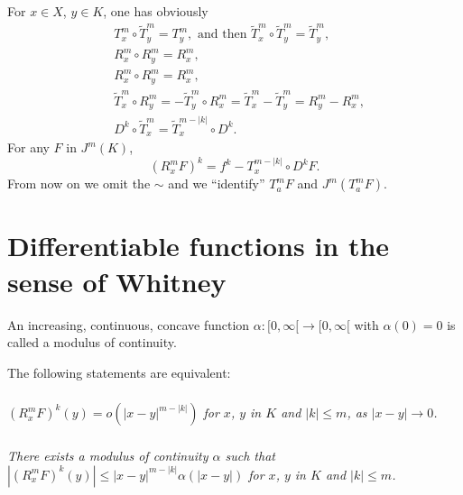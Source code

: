 For $x\in X$, $y\in K$, one has obviously
\begin{align}
& T^{m}_{x}\circ \widetilde{T}^{m}_{y}=T^{m}_{y},\text{ and then } \widetilde{T}^{m}_{x}\circ \widetilde{T}^{m}_{y}=\widetilde{T}^{m}_{y},\label{chap1-eq1.1}\\
& R^{m}_{x}\circ R^{m}_{y}=R^{m}_{x},\label{chap1-eq1.2}\\
& R^{m}_{x}\circ R^{m}_{y}=R^{m}_{x},\label{chap1-eq1.3}\\
& \widetilde{T}^{m}_{x}\circ R^{m}_{y}=-\widetilde{T}^{m}_{y}\circ R^{m}_{x}=\widetilde{T}^{m}_{x}-\widetilde{T}^{m}_{y}=R^{m}_{y}-R^{m}_{x},\label{chap1-eq1.4}\\
& D^{k}\circ \widetilde{T}^{m}_{x}=\widetilde{T}^{m-|k|}_{x}\circ D^{k}.\label{chap1-eq1.5}
\end{align}
For any $F$ in $J^{m}(K)$,
\begin{equation}
(R^{m}_{x}F)^{k}=f^{k}-T^{m-|k|}_{x}\circ D^{k}F.\label{chap1-eq1.6}
\end{equation}
From now on we omit the $\sim$ and we ``identify'' $T^{m}_{a}F$ and $J^{m}(T^{m}_{a}F)$.

\section{Differentiable functions in the sense of Whitney}\label{chap1-sec2}

\begin{definition}\label{chap1-defi2.1}
An increasing, continuous, concave function $\alpha:[0,\infty[\to [0,\infty[$ with $\alpha(0)=0$ is called a modulus of continuity.
\end{definition}

\begin{theorem}\label{chap1-thm2.2}
The following statements are equivalent:
\end{theorem}

\setcounter{subsection}{2}
\subsubsection{}\label{chap1-sec2.2.1}
{\em $(R^{m}_{x}F)^{k}(y)=o(|x-y|^{m-|k|})$ for $x$, $y$ in $K$ and $|k|\leq m$, as $|x-y|\to 0$.}

\subsubsection{}\label{chap1-sec2.2.2}
{\em There exists a modulus of continuity $\alpha$ such that $|(R^{m}_{x}F)^{k}(y)|\leq |x-y|^{m-|k|}\alpha(|x-y|)$ for $x$, $y$ in $K$ and $|k|\leq m$.}

